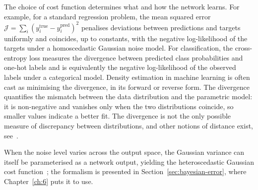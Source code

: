 The choice of cost function determines what and how the network learns. 
For example, for a standard regression problem, the mean squared error $\mathcal{J} = \sum_i (y_i^\mathrm{true} - y_i^\mathrm{pred})^2$ penalises deviations between predictions and targets uniformly and coincides, up to constants, with the negative log-likelihood of the targets under a homoscedastic Gaussian noise model.
For classification, the cross-entropy loss measures the divergence between predicted class probabilities and one-hot labels and is equivalently the negative log-likelihood of the observed labels under a categorical model.
Density estimation in machine learning is often cast as minimising the \KL divergence, in its forward or reverse form. The \KL divergence quantifies the mismatch between the data distribution and the parametric model: it is non-negative and vanishes only when the two distributions coincide, so smaller values indicate a better fit.
The \KL divergence is not the only possible measure of discrepancy between distributions, and other notions of distance exist, see~\cite{Goodfellow:2014gan, Lipman:2023hef}.

When the noise level varies across the output space, the Gaussian variance can itself be parameterised as a network output, yielding the heteroscedastic Gaussian cost function~\cite{heteroscedastic-error}; the formalism is presented in Section~\ref{sec:bayesian-error}, where Chapter~\ref{ch:6} puts it to use.

